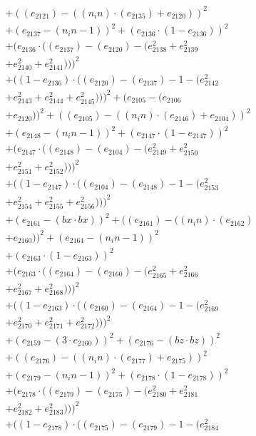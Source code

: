 \documentclass[10pt, a4paper]{article}
\begin{document}
\begin{small}
\begin{align*}
& + ((e_{2121}) - ((n_in)  \cdot  (e_{2135}) + e_{2120}))^{2} \\
& + (e_{2137} - (n_in - 1))^{2} + (e_{2136}  \cdot  (1 - e_{2136}))^{2} \\
& + (e_{2136}  \cdot  ((e_{2137}) - (e_{2120}) - (e_{2138}^{2} + e_{2139}^{2} \\
& + e_{2140}^{2} + e_{2141}^{2})))^{2} \\
& + ((1 - e_{2136})  \cdot  ((e_{2120}) - (e_{2137}) - 1 - (e_{2142}^{2} \\
& + e_{2143}^{2} + e_{2144}^{2} + e_{2145}^{2})))^{2} + (e_{2105} - (e_{2106} \\
& + e_{2120}))^{2} + ((e_{2105}) - ((n_in)  \cdot  (e_{2146}) + e_{2104}))^{2} \\
& + (e_{2148} - (n_in - 1))^{2} + (e_{2147}  \cdot  (1 - e_{2147}))^{2} \\
& + (e_{2147}  \cdot  ((e_{2148}) - (e_{2104}) - (e_{2149}^{2} + e_{2150}^{2} \\
& + e_{2151}^{2} + e_{2152}^{2})))^{2} \\
& + ((1 - e_{2147})  \cdot  ((e_{2104}) - (e_{2148}) - 1 - (e_{2153}^{2} \\
& + e_{2154}^{2} + e_{2155}^{2} + e_{2156}^{2})))^{2} \\
& + (e_{2161} - (bx  \cdot  bx))^{2} + ((e_{2161}) - ((n_in)  \cdot  (e_{2162}) \\
& + e_{2160}))^{2} + (e_{2164} - (n_in - 1))^{2} \\
& + (e_{2163}  \cdot  (1 - e_{2163}))^{2} \\
& + (e_{2163}  \cdot  ((e_{2164}) - (e_{2160}) - (e_{2165}^{2} + e_{2166}^{2} \\
& + e_{2167}^{2} + e_{2168}^{2})))^{2} \\
& + ((1 - e_{2163})  \cdot  ((e_{2160}) - (e_{2164}) - 1 - (e_{2169}^{2} \\
& + e_{2170}^{2} + e_{2171}^{2} + e_{2172}^{2})))^{2} \\
& + (e_{2159} - (3  \cdot  e_{2160}))^{2} + (e_{2176} - (bz  \cdot  bz))^{2} \\
& + ((e_{2176}) - ((n_in)  \cdot  (e_{2177}) + e_{2175}))^{2} \\
& + (e_{2179} - (n_in - 1))^{2} + (e_{2178}  \cdot  (1 - e_{2178}))^{2} \\
& + (e_{2178}  \cdot  ((e_{2179}) - (e_{2175}) - (e_{2180}^{2} + e_{2181}^{2} \\
& + e_{2182}^{2} + e_{2183}^{2})))^{2} \\
& + ((1 - e_{2178})  \cdot  ((e_{2175}) - (e_{2179}) - 1 - (e_{2184}^{2} \\

\end{align*}
\end{small}
\end{document}
